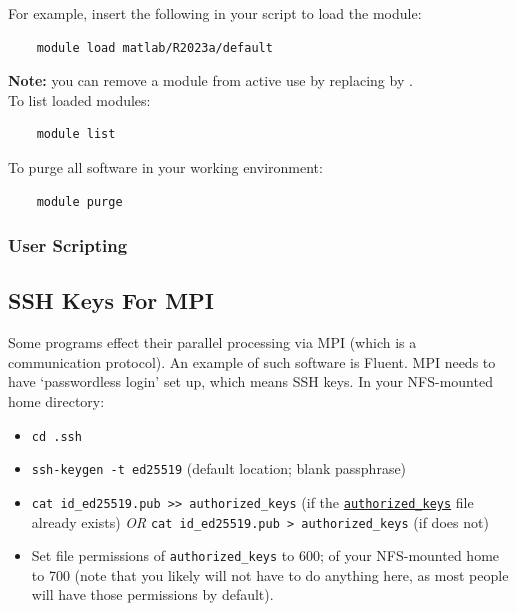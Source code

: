 \documentclass{easychair}
\begin{document}
\noindent For example, insert the following in your script to load the  module:
\begin{verbatim}
    module load matlab/R2023a/default
\end{verbatim}

\noindent \textbf{Note:} you can remove a module from active use by replacing  by .\\
    
\noindent To list loaded modules:
\begin{verbatim}
    module list
\end{verbatim}
    
\noindent To purge all software in your working environment:
\begin{verbatim}
    module purge
\end{verbatim}

\subsubsection{User Scripting}
\label{sect:scripting}



\subsection{SSH Keys For MPI}
\label{sect:ssh-mpi}

Some programs effect their parallel processing via MPI (which is a 
communication protocol). An example of such software is Fluent. MPI needs to 
have `passwordless login' set up, which means SSH keys. In your NFS-mounted 
home directory:

\begin{itemize}
\item
\texttt{cd .ssh}
\item
\texttt{ssh-keygen -t ed25519} (default location; blank passphrase) 
\item
\texttt{cat id\_ed25519.pub >> authorized\_keys} (if the \texttt{\href{https://www.ssh.com/academy/ssh/authorized-keys-file}{authorized\_keys}}
file already exists) \emph{OR} \texttt{cat id\_ed25519.pub > authorized\_keys} (if does not) 
\item
Set file permissions of \texttt{authorized\_keys} to 600; of your NFS-mounted home
to 700 (note that you likely will not have to do anything here, as most people
will have those permissions by default). 
\end{itemize}
\end{document}
